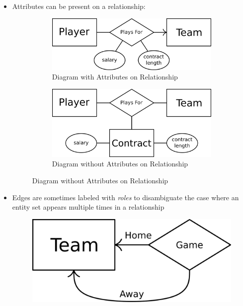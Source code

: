 \documentclass[a4paper]{article}
\begin{document}
\begin{itemize}
\item Attributes can be present on a relationship:
\begin{figure}[H]
\centering
\begin{subfigure}{0.49\linewidth}
\centering
\includegraphics[width=0.9\linewidth]{entity9.png}
\caption*{Diagram with Attributes on Relationship}
\end{subfigure}
\begin{subfigure}{0.49\linewidth}
\centering
\includegraphics[width=0.9\linewidth]{entity10.png}
\caption*{Diagram without Attributes on Relationship}
\end{subfigure}
\end{figure}
\item Edges are sometimes labeled with \emph{roles} to disambiguate the case where an entity set appears multiple times in a relationship
\begin{figure}[H]
\centering
\includegraphics[width=0.3\linewidth]{entity11.png}
\end{figure}
\end{itemize}
\end{document}
